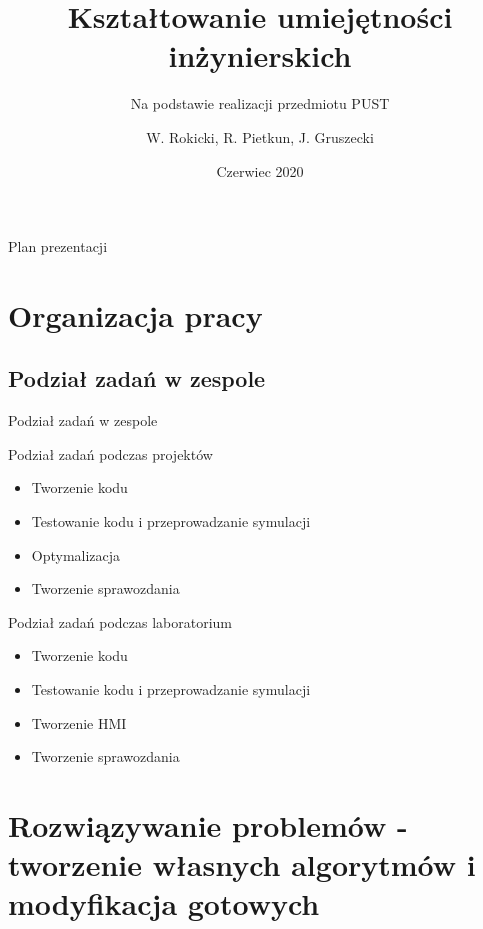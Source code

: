\documentclass{beamer}
\title{Kształtowanie umiejętności inżynierskich}
\subtitle{Na podstawie realizacji przedmiotu PUST}
\author{W. Rokicki, R. Pietkun, J. Gruszecki}
\date{Czerwiec 2020}
\begin{document}
\begin{frame}
\titlepage
\end{frame}

\begin{frame}{Plan prezentacji}
\tableofcontents    
\end{frame}

\section{Organizacja pracy}

	\subsection{Podział zadań w zespole}
	\begin{frame}{Podział zadań w zespole}
		\begin{block}{Podział zadań podczas projektów}
			\begin{itemize}
				\item Tworzenie kodu
				\item Testowanie kodu i przeprowadzanie symulacji
				\item Optymalizacja
				\item Tworzenie sprawozdania
			\end{itemize}
		\end{block}
		\begin{block}{Podział zadań podczas laboratorium}
			\begin{itemize}
				\item Tworzenie kodu
				\item Testowanie kodu i przeprowadzanie symulacji
				\item Tworzenie HMI
				\item Tworzenie sprawozdania
			\end{itemize}
		\end{block}
	\end{frame}

\section{Rozwiązywanie problemów - tworzenie własnych algorytmów i modyfikacja gotowych}
\end{document}
